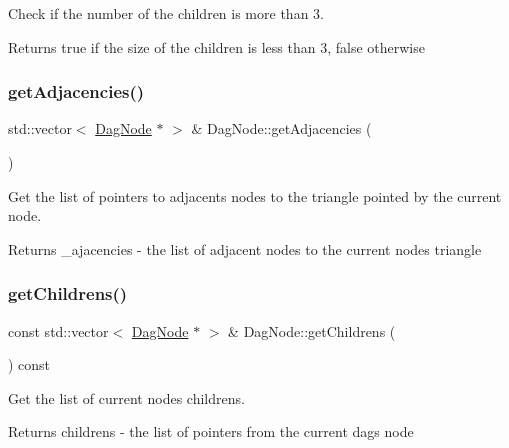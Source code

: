 Check if the number of the children is more than 3. 

\begin{DoxyReturn}{Returns}
true if the size of the children is less than 3, false otherwise 
\end{DoxyReturn}
\mbox{\label{classDagNode_abc1bd7d5b2a39d85cd7bd924cdc984b3}} 
\subsubsection{\texorpdfstring{get\+Adjacencies()}{getAdjacencies()}}
{\footnotesize\ttfamily std\+::vector$<$ \hyperlink{classDagNode}{Dag\+Node} $\ast$ $>$ \& Dag\+Node\+::get\+Adjacencies (\begin{DoxyParamCaption}{ }\end{DoxyParamCaption})\hspace{0.3cm}{\ttfamily [inline]}}



Get the list of pointers to adjacents nodes to the triangle pointed by the current node. 

\begin{DoxyReturn}{Returns}
\+\_\+ajacencies -\/ the list of adjacent nodes to the current node\textquotesingle{}s triangle 
\end{DoxyReturn}
\mbox{\label{classDagNode_a9da177349ffbfc980455d9ceae277d23}} 
\subsubsection{\texorpdfstring{get\+Childrens()}{getChildrens()}}
{\footnotesize\ttfamily const std\+::vector$<$ \hyperlink{classDagNode}{Dag\+Node} $\ast$ $>$ \& Dag\+Node\+::get\+Childrens (\begin{DoxyParamCaption}{ }\end{DoxyParamCaption}) const\hspace{0.3cm}{\ttfamily [inline]}}



Get the list of current node\textquotesingle{}s childrens. 

\begin{DoxyReturn}{Returns}
childrens -\/ the list of pointers from the current dag\textquotesingle{}s node 
\end{DoxyReturn}
\mbox{\label{classDagNode_a35869cdb3ff3900d2ed4366270a39b83}} 
